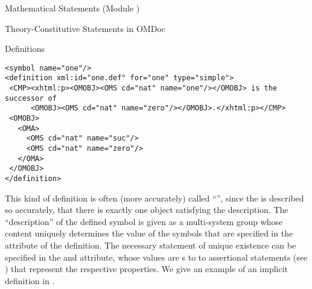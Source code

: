 \begin{tchapter}[id=statements,short=Mathematical Statements]{Mathematical Statements (Module {})}
\begin{tsection}[id=definitions]{Theory-Constitutive Statements in OMDoc}
\begin{tsubsection}[id=definitions]{Definitions}
\begin{description}
\begin{lstlisting}[label=lst:one,
  caption={A Simple {\omdoc} {\element{definition}}.},
  index={definition,CMP,FMP,OMOBJ}]
<symbol name="one"/>
<definition xml:id="one.def" for="one" type="simple">
 <CMP><xhtml:p><OMOBJ><OMS cd="nat" name="one"/></OMOBJ> is the successor of 
      <OMOBJ><OMS cd="nat" name="zero"/></OMOBJ>.</xhtml:p></CMP>
 <OMOBJ>
   <OMA>
     <OMS cd="nat" name="suc"/>
     <OMS cd="nat" name="zero"/>
   </OMA>
 </OMOBJ>
</definition>
\end{lstlisting}
\item[{\attval{implicit}{type}{definition}}] This kind of definition is often (more
  accurately) called ``{\emph{}}'', since the
  {} is described so accurately, that there is exactly one object
  satisfying the description. The ``description'' of the defined symbol is given as a
  multi-system {} group whose content uniquely determines the value of the
  symbols that are specified in the {} attribute of the
  definition. The necessary statement of unique existence can be specified in the
  {} and {} attribute,
  whose values are {s} to to assertional
  statements (see ) that represent the
  respective properties.  We give an example of an implicit definition in
  {}.


\end{description}
\end{tsubsection}
\end{tsection}
\end{tchapter}
